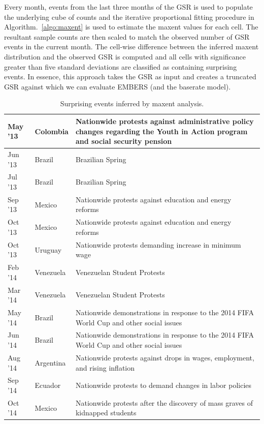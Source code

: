 Every month, events from the last three months of the
GSR is used to populate the underlying cube of counts and the iterative proportional fitting procedure in Algorithm.~\ref{algo:maxent} is
used to estimate the maxent values for each cell. The resultant sample counts are then scaled to
match the observed number of GSR events in the current month. The cell-wise difference between the inferred
maxent distribution and the observed GSR is computed and all cells with significance greater than five standard
deviations are classified as containing surprising events. In essence, this approach takes the GSR as input and
creates a truncated GSR against which we can evaluate EMBERS (and the baserate model).

\begin{table}
\caption{Surprising events inferred by maxent analysis.}
\renewcommand{\arraystretch}{1.1}
\vspace{-3mm}
 \centering
 \begin{tabular}{|l|l|m{5cm}|}
 \hline
May '13  &  Colombia	 &  Nationwide protests against administrative policy changes regarding the
Youth in Action program and social security pension \\ \hline
Jun '13  &  Brazil  &  Brazilian Spring \\ \hline
Jul '13  &  Brazil  &  Brazilian Spring \\ \hline
Sep '13  &  Mexico  &  Nationwide protests against education and energy reforms \\ \hline
Oct '13  &  Mexico  &  Nationwide protests against education and energy reforms \\ \hline
Oct '13  &  Uruguay  &  Nationwide protests demanding increase in minimum wage \\ \hline
Feb '14  &  Venezuela	  &  Venezuelan Student Protests \\ \hline
Mar '14  &  Venezuela  &  	Venezuelan Student Protests \\ \hline
May '14  &  Brazil  &  Nationwide demonstrations in response to the 2014 FIFA World Cup and other social issues \\ \hline
Jun '14  &  Brazil  &  Nationwide demonstrations in response to the 2014 FIFA World Cup and other social issues \\ \hline
Aug '14  &  Argentina	  &  Nationwide protests against drops in wages, employment, and rising inflation \\ \hline
Sep '14  &  Ecuador  &  Nationwide protests to demand changes in labor policies \\ \hline
Oct '14  &  Mexico  &  Nationwide protests after the discovery of mass graves of kidnapped students  \\ \hline
\end{tabular}
\label{tab:maxentEvents}
\end{table}

